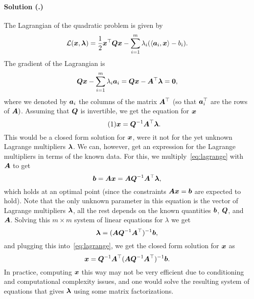 \documentclass{article}
\newcounter{problemSheetNumber}
\newcounter{problems}
\renewcommand{\solution}[1]{\paragraph{Solution (\theproblemSheetNumber.\theproblems)}\addtocounter{problems}{1}\label{#1}}
\begin{document}
\solution{pr:3} The Lagrangian of the quadratic problem is given by
\begin{equation*}
  \mathcal{L}(\bm{x},\bm{\lambda}) = \frac{1}{2}\bm{x}^{\top}\bm{Q}\bm{x}-\sum_{i=1}^m \lambda_i (\langle {\bm{a}_i}, {\bm{x}} \rangle-b_i).
\end{equation*}
The gradient of the Lagrangian is
\begin{equation*}
  \bm{Q}\bm{x}-\sum_{i=1}^m \lambda_i \bm{a}_i = \bm{Q}\bm{x}-\bm{A}^{\top}\bm{\lambda} = \bm{0},
\end{equation*}
where we denoted by $\bm{a}_i$ the columns of the matrix $\bm{A}^{\top}$ (so that $\bm{a}_i^{\top}$ are the rows of $\bm{A})$. Assuming that $\bm{Q}$ is invertible, we get the equation for $\bm{x}$
\begin{equation}\label{eq:lagrange}\tag{1}
  \bm{x} = \bm{Q}^{-1}\bm{A}^{\top}\bm{\lambda}.
\end{equation} 
This would be a closed form solution for $\bm{x}$, were it not for the yet unknown Lagrange multipliers $\bm{\lambda}$. We can, however, get an expression for the Lagrange multipliers in terms of the known data. For this, we multiply~\eqref{eq:lagrange} with $\bm{A}$ to get
\begin{equation*}
  \bm{b} = \bm{A}\bm{x} = \bm{A}\bm{Q}^{-1}\bm{A}^{\top}\bm{\lambda},
\end{equation*}
which holds at an optimal point (since the constraints $\bm{A}\bm{x}=\bm{b}$ are expected to hold). Note that the only unknown parameter in this equation is the vector of Lagrange multipliers $\bm{\lambda}$, all the rest depends on the known quantities $\bm{b}$, $\bm{Q}$, and $\bm{A}$. Solving this $m\times m$ system of linear equations for $\lambda$ we get
\begin{equation*}
  \bm{\lambda} = (\bm{A}\bm{Q}^{-1}\bm{A}^{\top})^{-1} \bm{b},
\end{equation*}
and plugging this into~\eqref{eq:lagrange}, we get the closed form solution for $\bm{x}$ as
\begin{equation*}
  \bm{x} = \bm{Q}^{-1}\bm{A}^{\top}(\bm{A}\bm{Q}^{-1}\bm{A}^{\top})^{-1} \bm{b}.
\end{equation*}
In practice, computing $\bm{x}$ this way may not be very efficient due to conditioning and computational complexity issues, and one would solve the resulting system of equations that gives $\bm{\lambda}$ using some matrix factorizations.
\end{document}
